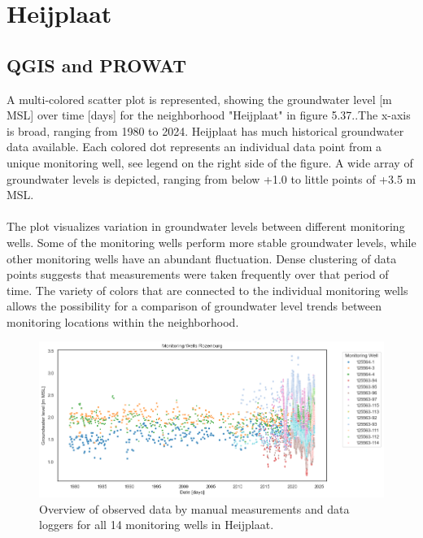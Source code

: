 \clearpage

\section{Heijplaat}
\subsection{QGIS and PROWAT}

A multi-colored scatter plot is represented, showing the groundwater level [m MSL] over time [days] for the neighborhood "Heijplaat" in figure 5.37..The x-axis is broad, ranging from 1980 to 2024. Heijplaat has much historical groundwater data available. Each colored dot represents an individual data point from a unique monitoring well, see legend on the right side of the figure. A wide array of groundwater levels is depicted, ranging from below +1.0 to little points of +3.5 m MSL. 
\\
\\
The plot visualizes variation in groundwater levels between different monitoring wells. Some of the monitoring wells perform more stable groundwater levels, while other monitoring wells have an abundant fluctuation. Dense clustering of data points suggests that measurements were taken frequently over that period of time. The variety of colors that are connected to the individual monitoring wells allows the possibility for a comparison of groundwater level trends between monitoring locations within the neighborhood. \\
\begin{figure}[htbp]
    \centering
    \includegraphics[width=0.75\linewidth]{scatterheij.png}
    \caption{Overview of observed data by manual measurements and data loggers for all 14 monitoring wells in Heijplaat.}
\end{figure}\\

